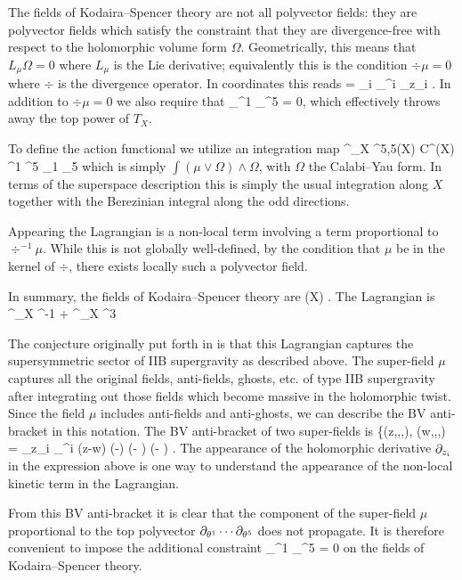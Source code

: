 \documentclass[../main.tex]{subfiles}
\begin{document}
The fields of Kodaira--Spencer theory are not all polyvector fields: they are polyvector fields which satisfy the constraint that they are divergence-free with respect to the holomorphic volume form $\Omega$.
Geometrically, this means that $L_\mu \Omega = 0$ where $L_\mu$ is the Lie derivative; equivalently this is the condition $\div \mu = 0$ where $\div$ is the divergence operator.
In coordinates this reads
\beqn
\div = \sum_i \del_{\theta^i} \del_{z_i} .
\eeqn
In addition to $\div \mu = 0$ we also require that 
\beqn
\del_{\theta^1} \cdots \del_{\theta^5} \mu = 0,
\eeqn
which effectively throws away the top power of $T_X$.

To define the action functional we utilize an integration map
\beqn\label{eqn:cyintegral}
\int^\Omega_X \colon \PV^{5,5}(X) \simeq C^\infty(X) \theta^1 \cdots \theta^5 \br \theta_1 \cdots \br \theta_5 \to \C
\eeqn
which is simply $\int ( \mu \vee \Omega) \wedge \Omega$, with $\Omega$ the Calabi--Yau form.
In terms of the superspace description this is simply the usual integration along $X$ together with the Berezinian integral along the odd directions.

Appearing the Lagrangian is a non-local term involving a term proportional to $\div^{-1} \mu$.
While this is not globally well-defined, by the condition that $\mu$ be in the kernel of $\div$, there exists locally such a polyvector field.

In summary, the fields of Kodaira--Spencer theory are
\beqn
\PV(X) \cap \ker \div .
\eeqn
The Lagrangian is
\beqn
{} \int^\Omega_X \mu \dbar \del^{-1} \mu +  \int^\Omega_X \mu^3 
\eeqn

The conjecture originally put forth in \cite{CLsugra} is that this Lagrangian captures the supersymmetric sector of IIB supergravity as described above.
The super-field $\mu$ captures all the original fields, anti-fields, ghosts, etc. of type IIB supergravity after integrating out those fields which become massive in the holomorphic twist.
Since the field $\mu$ includes anti-fields and anti-ghosts, we can describe the BV anti-bracket in this notation.
The BV anti-bracket of two super-fields is
\beqn
\{\mu(z,\zbar,\theta,\br \theta), \mu(w,\wbar,\eta,\br \eta) = \del_{z_i} \del_{\theta^i} \delta(z-w) \delta(\zbar-\wbar) (\br \theta - \br \eta) (\theta - \eta)  .
\eeqn
The appearance of the holomorphic derivative $\partial_{z_i}$ in the expression above is one way to understand the appearance of the non-local kinetic term in the Lagrangian.

From this BV anti-bracket it is clear that the component of the super-field $\mu$ proportional to the top polyvector $\partial_{\theta^1} \cdots \partial_{\theta^5}$ does not propagate. 
It is therefore convenient to impose the additional constraint 
\beqn
\del_{\theta^1} \cdots \del_{\theta^5} \mu = 0 
\eeqn
on the fields of Kodaira--Spencer theory.
\end{document}
